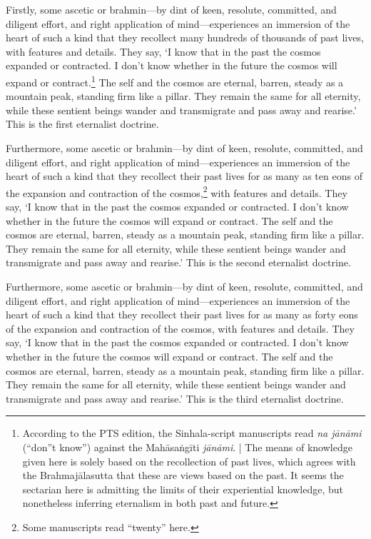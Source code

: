 \documentclass[12pt,openany]{book}%
\begin{document}
Firstly, some ascetic or brahmin—by dint of keen, resolute, committed, and diligent effort, and right application of mind—experiences an immersion of the heart of such a kind that they recollect many hundreds of thousands of past lives, with features and details. They say, ‘I know that in the past the cosmos expanded or contracted. I don’t know whether in the future the cosmos will expand or contract.\footnote{According to the PTS edition, the Sinhala-script manuscripts read \textit{na \textsanskrit{jānāmi}} (“don”t know”) against the \textsanskrit{Mahāsaṅgīti} \textit{\textsanskrit{jānāmi}}. | The means of knowledge given here is solely based on the recollection of past lives, which agrees with the \textsanskrit{Brahmajālasutta} that these are views based on the past. It seems the sectarian here is admitting the limits of their experiential knowledge, but nonetheless inferring eternalism in both past and future. } The self and the cosmos are eternal, barren, steady as a mountain peak, standing firm like a pillar. They remain the same for all eternity, while these sentient beings wander and transmigrate and pass away and rearise.’ This is the first eternalist doctrine. 

Furthermore, some ascetic or brahmin—by dint of keen, resolute, committed, and diligent effort, and right application of mind—experiences an immersion of the heart of such a kind that they recollect their past lives for as many as ten eons of the expansion and contraction of the cosmos,\footnote{Some manuscripts read “twenty” here. } with features and details. They say, ‘I know that in the past the cosmos expanded or contracted. I don’t know whether in the future the cosmos will expand or contract. The self and the cosmos are eternal, barren, steady as a mountain peak, standing firm like a pillar. They remain the same for all eternity, while these sentient beings wander and transmigrate and pass away and rearise.’ This is the second eternalist doctrine. 

Furthermore, some ascetic or brahmin—by dint of keen, resolute, committed, and diligent effort, and right application of mind—experiences an immersion of the heart of such a kind that they recollect their past lives for as many as forty eons of the expansion and contraction of the cosmos, with features and details. They say, ‘I know that in the past the cosmos expanded or contracted. I don’t know whether in the future the cosmos will expand or contract. The self and the cosmos are eternal, barren, steady as a mountain peak, standing firm like a pillar. They remain the same for all eternity, while these sentient beings wander and transmigrate and pass away and rearise.’ This is the third eternalist doctrine. 
\end{document}
